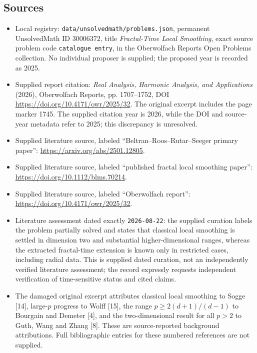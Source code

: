 \documentclass[11pt]{article}
\begin{document}
\subsection{Sources}
\begin{itemize}
\item Local registry: \texttt{data/unsolvedmath/problems.json}, permanent UnsolvedMath ID \(30006372\), title \emph{Fractal-Time Local Smoothing}, exact source problem code \texttt{catalogue entry}, in the Oberwolfach Reports Open Problems collection. No individual proposer is supplied; the proposed year is recorded as 2025.
\item Supplied report citation: \emph{Real Analysis, Harmonic Analysis, and Applications} (2026), Oberwolfach Reports, pp. 1707--1752, DOI \url{https://doi.org/10.4171/owr/2025/32}. The original excerpt includes the page marker 1745. The supplied citation year is 2026, while the DOI and source-year metadata refer to 2025; this discrepancy is unresolved.
\item Supplied literature source, labeled ``Beltran--Roos--Rutar--Seeger primary paper'': \url{https://arxiv.org/abs/2501.12805}.
\item Supplied literature source, labeled ``published fractal local smoothing paper'': \url{https://doi.org/10.1112/blms.70214}.
\item Supplied literature source, labeled ``Oberwolfach report'': \url{https://doi.org/10.4171/owr/2025/32}.
\item Literature assessment dated exactly \texttt{2026-08-22}: the supplied curation labels the problem partially solved and states that classical local smoothing is settled in dimension two and substantial higher-dimensional ranges, whereas the extracted fractal-time extension is known only in restricted cases, including radial data. This is supplied dated curation, not an independently verified literature assessment; the record expressly requests independent verification of time-sensitive status and cited claims.
\item The damaged original excerpt attributes classical local smoothing to Sogge [14], large-\(p\) progress to Wolff [15], the range \(p\geq 2(d+1)/(d-1)\) to Bourgain and Demeter [4], and the two-dimensional result for all \(p>2\) to Guth, Wang and Zhang [8]. These are source-reported background attributions. Full bibliographic entries for these numbered references are not supplied.
\end{itemize}
\end{document}
